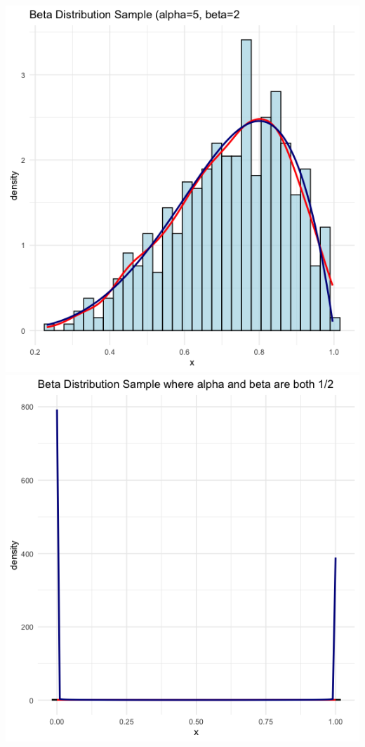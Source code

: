 \documentclass{article}\usepackage[]{graphicx}\usepackage[]{xcolor}
\begin{document}
\includegraphics[scale=0.3]{beta distribution with alpha 5 beta 2 with sample data.png}
\includegraphics[scale=0.3]{beta distribution with alpha .5 beta .5 with sample data.png}
\end{document}
